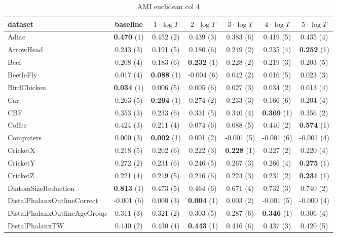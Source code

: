     \begin{table}[ht]
    \caption{AMI euclidean col 4} 
    \begin{adjustbox}{width=\textwidth}
    \begin{tabular}{lcccccc}
    \hline
    dataset & baseline & \textbf{$1\cdot \log{T}$} & \textbf{$2\cdot \log{T}$} & \textbf{$3\cdot \log{T}$} & \textbf{$4\cdot \log{T}$} & \textbf{$5\cdot \log{T}$} \\ \hline
    Adiac & \textbf{0.470} (1) & 0.452 (2) & 0.439 (3) & 0.383 (6) & 0.419 (5) & 0.435 (4) \\
    ArrowHead & 0.243 (3) & 0.191 (5) & 0.180 (6) & 0.249 (2) & 0.235 (4) & \textbf{0.252} (1) \\
    Beef & 0.208 (4) & 0.183 (6) & \textbf{0.232} (1) & 0.228 (2) & 0.219 (3) & 0.203 (5) \\
    BeetleFly & 0.017 (4) & \textbf{0.088} (1) & -0.004 (6) & 0.042 (2) & 0.016 (5) & 0.023 (3) \\
    BirdChicken & \textbf{0.034} (1) & 0.006 (5) & 0.005 (6) & 0.027 (3) & 0.034 (2) & 0.013 (4) \\
    Car & 0.203 (5) & \textbf{0.294} (1) & 0.274 (2) & 0.233 (3) & 0.166 (6) & 0.204 (4) \\
    CBF & 0.353 (3) & 0.233 (6) & 0.331 (5) & 0.340 (4) & \textbf{0.369} (1) & 0.356 (2) \\
    Coffee & 0.424 (3) & 0.211 (4) & 0.074 (6) & 0.088 (5) & 0.440 (2) & \textbf{0.574} (1) \\
    Computers & 0.000 (3) & \textbf{0.002} (1) & 0.001 (2) & -0.001 (5) & -0.001 (6) & -0.001 (4) \\
    CricketX & 0.218 (5) & 0.202 (6) & 0.222 (3) & \textbf{0.228} (1) & 0.227 (2) & 0.220 (4) \\
    CricketY & 0.272 (2) & 0.231 (6) & 0.246 (5) & 0.267 (3) & 0.266 (4) & \textbf{0.275} (1) \\
    CricketZ & 0.221 (4) & 0.219 (5) & 0.216 (6) & 0.224 (3) & 0.231 (2) & \textbf{0.231} (1) \\
    DiatomSizeReduction & \textbf{0.813} (1) & 0.473 (5) & 0.464 (6) & 0.671 (4) & 0.732 (3) & 0.740 (2) \\
    DistalPhalanxOutlineCorrect & -0.001 (6) & 0.000 (3) & \textbf{0.004} (1) & 0.003 (2) & -0.001 (5) & -0.000 (4) \\
    DistalPhalanxOutlineAgeGroup & 0.311 (3) & 0.321 (2) & 0.303 (5) & 0.287 (6) & \textbf{0.346} (1) & 0.306 (4) \\
    DistalPhalanxTW & 0.440 (2) & 0.430 (4) & \textbf{0.443} (1) & 0.416 (6) & 0.437 (3) & 0.420 (5) \\

\end{tabular}
\end{adjustbox}
\end{table}
